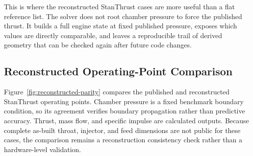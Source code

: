 \documentclass[11pt]{article}
\begin{document}
This is where the reconstructed StanThrust cases are more useful than a flat reference list. The solver does not root chamber pressure to force the published thrust. It builds a full engine state at fixed published pressure, exposes which values are directly comparable, and leaves a reproducible trail of derived geometry that can be checked again after future code changes.

\subsection*{Reconstructed Operating-Point Comparison}
Figure~\ref{fig:reconstructed-parity} compares the published and reconstructed StanThrust operating points. Chamber pressure is a fixed benchmark boundary condition, so its agreement verifies boundary propagation rather than predictive accuracy. Thrust, mass flow, and specific impulse are calculated outputs. Because complete as-built throat, injector, and feed dimensions are not public for these cases, the comparison remains a reconstruction consistency check rather than a hardware-level validation.
\end{document}
